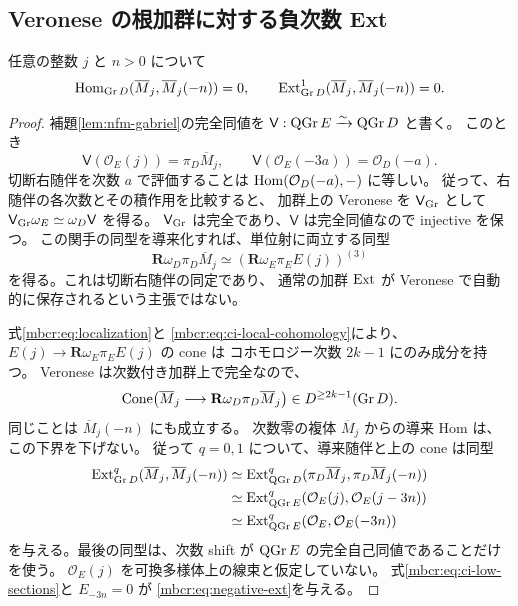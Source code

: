 \subsection{Veronese の根加群に対する負次数 Ext}

\begin{proposition}[根加群の負次数消滅]
\label{mbcr:prop:negative-ext}
任意の整数 $j$ と $n>0$ について
\begin{equation}\label{mbcr:eq:negative-ext}
 \operatorname{Hom}_{\operatorname{Gr} D}(\overline M_j,\overline M_j(-n))=0,\qquad
 \operatorname{Ext}^1_{\operatorname{Gr} D}(\overline M_j,\overline M_j(-n))=0 .
\end{equation}
\end{proposition}
\begin{proof}
補題\ref{lem:nfm-gabriel}の完全同値を
$\mathsf V:\operatorname{QGr} E\xrightarrow{\sim}\operatorname{QGr} D$ と書く。
このとき
\[
 \mathsf V(\mathcal O_E(j))=\pi_D\overline M_j,\qquad
 \mathsf V(\mathcal O_E(-3a))=\mathcal O_D(-a).
\]
切断右随伴を次数 $a$ で評価することは
$\operatorname{Hom}(\mathcal O_D(-a),-)$ に等しい。
従って、右随伴の各次数とその積作用を比較すると、
加群上の Veronese を $\mathsf V_{\operatorname{Gr}}$ として
$\mathsf V_{\operatorname{Gr}}\omega_E\simeq\omega_D\mathsf V$ を得る。
$\mathsf V_{\operatorname{Gr}}$ は完全であり、$\mathsf V$ は完全同値なので injective を保つ。
この関手の同型を導来化すれば、単位射に両立する同型
\begin{equation}\label{mbcr:eq:veronese-sections}
 \mathbf R\omega_D\pi_D\overline M_j
 \simeq
 \left(\mathbf R\omega_E\pi_E E(j)\right)^{(3)}
\end{equation}
を得る。これは切断右随伴の同定であり、
通常の加群 $\operatorname{Ext}$ が Veronese で自動的に保存されるという主張ではない。

式\eqref{mbcr:eq:localization}と
\eqref{mbcr:eq:ci-local-cohomology}により、
$E(j)\to\mathbf R\omega_E\pi_EE(j)$ の cone は
コホモロジー次数 $2k-1$ にのみ成分を持つ。
Veronese は次数付き加群上で完全なので、
\[
 \operatorname{Cone}\!
 \left(\overline M_j\longrightarrow\mathbf R\omega_D\pi_D\overline M_j\right)
 \in D^{\geq2k-1}(\operatorname{Gr} D).
\]
同じことは $\overline M_j(-n)$ にも成立する。
次数零の複体 $\overline M_j$ からの導来 Hom は、この下界を下げない。
従って $q=0,1$ について、導来随伴と上の cone は同型
\begin{align*}
 \operatorname{Ext}^q_{\operatorname{Gr} D}(\overline M_j,\overline M_j(-n))
 &\simeq
 \operatorname{Ext}^q_{\operatorname{QGr} D}(\pi_D\overline M_j,\pi_D\overline M_j(-n))\\
 &\simeq
 \operatorname{Ext}^q_{\operatorname{QGr} E}(\mathcal O_E(j),\mathcal O_E(j-3n))\\
 &\simeq
 \operatorname{Ext}^q_{\operatorname{QGr} E}(\mathcal O_E,\mathcal O_E(-3n))
\end{align*}
を与える。最後の同型は、次数 shift が $\operatorname{QGr} E$ の完全自己同値であることだけを使う。
$\mathcal O_E(j)$ を可換多様体上の線束と仮定していない。
式\eqref{mbcr:eq:ci-low-sections}と $E_{-3n}=0$ が
\eqref{mbcr:eq:negative-ext}を与える。
\end{proof}

